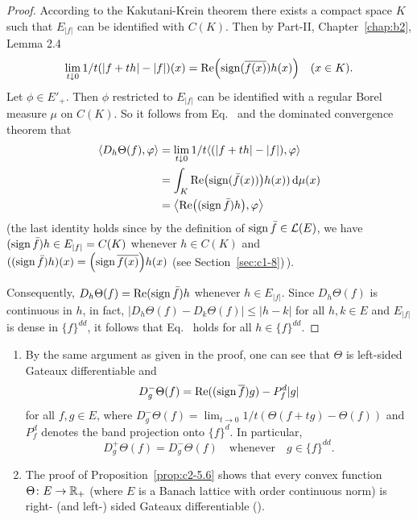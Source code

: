 \begin{proof}
According to the Kakutani-Krein theorem there exists a compact space
$K$ such that $E_{|f|}$ can be identified with $C(K)$. Then by Part-II, Chapter~\ref{chap:b2}, 
Lemma 2.4
\begin{equation}\label{eq:c2-5.9}
\lim_{t \downarrow 0} 1/t(|f+th| - |f|)(x) = \Re\mleft(\sign (\overline{f(x)})h(x)\mright) \quad (x \in K).
\end{equation}
Let $\phi \in E'_{+}$. Then $\phi$ restricted to $E_{|f|}$ can be identified with a regular Borel measure $\mu$ on $C(K)$.
So it follows from Eq.~ and the dominated convergence theorem that
\begin{align*}
\langle D_{h}\Theta(f),\phi \rangle &= \lim_{t \downarrow 0} 1/t \langle(|f + th| - |f|),\phi \rangle\\
&= \int_{K} \Re\mleft(\sign (\bar{f}(x))\mright)h(x)) \diff{\mu(x)} \\
&= \mleft\langle\Re\mleft((\sign  \bar{f})h\mright),\phi\mright\rangle
\end{align*}
(the last identity holds since by the definition of\/ $\operatorname{sign}  \bar{f} \in \mathcal{L}(E)$,
we have $(\operatorname{sign}  \bar{f})h \in E_{|f|} = C(K)$ whenever $h \in C(K)$ and
$((\sign  \bar{f})h)(x) = \mleft(\sign  \overline{f(x)}\mright)h(x)$  
(see Section~\ref{sec:c1-8})\,).

Consequently, $D_{h}\Theta(f) = \mathop{}\!\mathrm{Re}(\operatorname{sign}  \bar{f})h$ whenever $h \in E_{|f|}$. 
Since $D_{h}\Theta(f)$ is continuous in $h$, in fact, $|D_{h}\Theta(f) - D_{k}\Theta(f)| \leq |h - k|$ for all $h,k \in E$ and $E_{|f|}$ is dense in $\{f\}^{dd}$, it follows that Eq.~ holds for all $h \in \{f\}^{dd}$.
\end{proof}
\begin{remark}\label{rem:c2-5.7} 
\begin{enumerate}[\upshape (i), wide, labelindent=.25em] %
\item \label{rem:c2-5.7-1}
By the same argument as given in the proof, one can see
that $\Theta$ is left-sided Gateaux differentiable and
\begin{equation*}
D^{-}_{g}\Theta(f) = \mathop{}\!\mathrm{Re}((\operatorname{sign}  \overline{f})g) - P^{d}_{f}|g|
\end{equation*}
for all $f, g \in E$, where $D^{-}_{g}\Theta(f) = \lim_{t \to 0} 1/t(\Theta(f + tg) - \Theta(f))$ and
$P^{d}_{f}$ denotes the band projection onto $\{f\}^{d}$. 
In particular,
\begin{equation}\label{eq:c2-5.10}
D^{+}_{g}\Theta(f) = D^{-}_{g}\Theta(f) \quad \text{whenever} \quad g \in \{f\}^{dd}.
\end{equation}
\item \label{rem:c2-5.7-2}
The proof of  Proposition~\ref{prop:c2-5.6}   shows that every convex function $\Theta \colon E \to \mathbb{R}_{+}$
(where $E$ is a Banach lattice with order continuous norm) is right- (and left-) sided Gateaux differentiable (\cf \textcite{ arendt:1982}).
\end{enumerate}
\end{remark}
